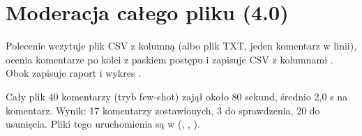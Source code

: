 \section{Moderacja całego pliku (4.0)}
\label{sec:wsadowo}

Polecenie  wczytuje plik CSV z kolumną  (albo plik TXT, jeden komentarz w linii),
ocenia komentarze po kolei z paskiem postępu i zapisuje CSV z kolumnami . Obok zapisuje raport  i wykres .



Cały plik 40 komentarzy (tryb few-shot) zajął około 80 sekund, średnio 2,0 s na komentarz. Wynik: 17 komentarzy
zostawionych, 3 do sprawdzenia, 20 do usunięcia. Pliki tego uruchomienia są w 
(, , ).
